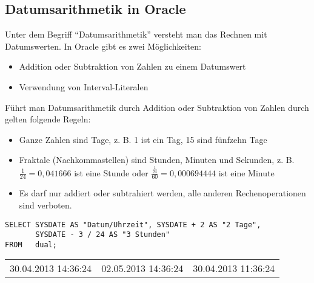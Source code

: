 \subsection{Datumsarithmetik in Oracle}
Unter dem Begriff \enquote{Datumsarithmetik} versteht man das Rechnen mit Datumswerten. In Oracle gibt es zwei Möglichkeiten:
\begin{itemize}
    \item Addition oder Subtraktion von Zahlen zu einem Datumswert
    \item Verwendung von Interval-Literalen
\end{itemize}
Führt man Datumsarithmetik durch Addition oder Subtraktion von Zahlen durch gelten folgende Regeln:
\begin{itemize}
    \item Ganze Zahlen sind Tage, z. B. 1 ist ein Tag, 15 sind fünfzehn Tage
    \item Fraktale (Nachkommastellen) sind Stunden, Minuten und Sekunden, z. B. $\frac{1}{24}=0,041666$ ist eine Stunde oder $\frac{\frac{1}{24}}{60}=0,000694444$ ist eine Minute
    \item Es darf nur addiert oder subtrahiert werden, alle anderen Rechenoperationen sind verboten.
\end{itemize}
\begin{lstlisting}[language=oracle_sql,caption={Einfache Datumsarithmetik in Oracle},label=sql03_19]
SELECT SYSDATE AS "Datum/Uhrzeit", SYSDATE + 2 AS "2 Tage",
       SYSDATE - 3 / 24 AS "3 Stunden"
FROM   dual;
        \end{lstlisting}
\begin{center}
    \begin{small}
        \tablehead{}
        \tabletail {
        }
        \begin{oraclesql}
            \begin{supertabular}{lll}
                30.04.2013 14:36:24 & 02.05.2013 14:36:24 & 30.04.2013 11:36:24 \\
            \end{supertabular}
        \end{oraclesql}
    \end{small}
\end{center}
